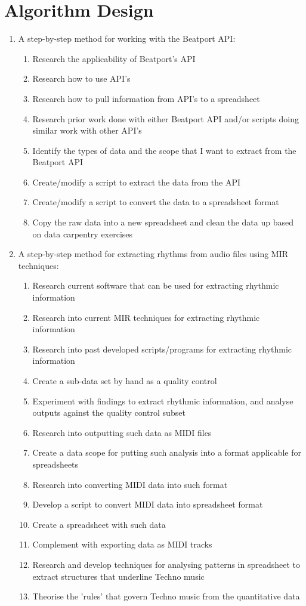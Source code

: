 \documentclass{article}
\begin{document}
\section{Algorithm Design}
\begin{enumerate}
    \item A step-by-step method for working with the Beatport API:
    \begin{enumerate}
        \item Research the applicability of Beatport's API
        \item Research how to use API's
        \item Research how to pull information from API's to a spreadsheet
        \item Research prior work done with either Beatport API and/or scripts doing similar work with other API's
        \item Identify the types of data and the scope that I want to extract from the Beatport API
        \item Create/modify a script to extract the data from the API
        \item Create/modify a script to convert the data to a spreadsheet format
        \item Copy the raw data into a new spreadsheet and clean the data up based on data carpentry exercises
    \end{enumerate}
    \item A step-by-step method for extracting rhythms from audio files using MIR techniques:
    \begin{enumerate}
        \item Research current software that can be used for extracting rhythmic information
        \item Research into current MIR techniques for extracting rhythmic information
        \item Research into past developed scripts/programs for extracting rhythmic information
        \item Create a sub-data set by hand as a quality control
        \item Experiment with findings to extract rhythmic information, and analyse outputs against the quality control subset
        \item Research into outputting such data as MIDI files
        \item Create a data scope for putting such analysis into a format applicable for spreadsheets
        \item Research into converting MIDI data into such format
        \item Develop a script to convert MIDI data into spreadsheet format
        \item Create a spreadsheet with such data
        \item Complement with exporting data as MIDI tracks
        \item Research and develop techniques for analysing patterns in spreadsheet to extract structures that underline Techno music
        \item Theorise the 'rules' that govern Techno music from the quantitative data
    \end{enumerate}
\end{enumerate}
\end{document}
